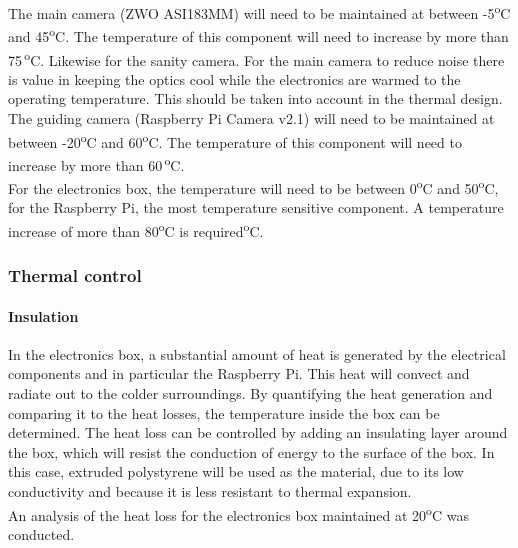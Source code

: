 The main camera (ZWO ASI183MM) will need to be maintained at between -5\textsuperscript{o}C and 45\textsuperscript{o}C. The temperature of this component will need to increase by more than 75\,\textsuperscript{o}C. Likewise for the sanity camera. For the main camera to reduce noise there is value in keeping the optics cool while the electronics are warmed to the operating temperature. This should be taken into account in the thermal design.\\

The guiding camera (Raspberry Pi Camera v2.1) will need to be maintained at between -20\textsuperscript{o}C and 60\textsuperscript{o}C. The temperature of this component will need to increase by more than 60\,\textsuperscript{o}C.\\

For the electronics box, the temperature will need to be between 0\textsuperscript{o}C and 50\textsuperscript{o}C, for the Raspberry Pi, the most temperature sensitive component. A temperature increase of more than 80\textsuperscript{o}C is required\textsuperscript{o}C.\\

\subsubsection{Thermal control}

\paragraph{Insulation}

In the electronics box, a substantial amount of heat is generated by the electrical components and in particular the Raspberry Pi. This heat will convect and radiate out to the colder surroundings. By quantifying the heat generation and comparing it to the heat losses, the temperature inside the box can be determined. The heat loss can be controlled by adding an insulating layer around the box, which will resist the conduction of energy to the surface of the box. In this case, extruded polystyrene will be used as the material, due to its low conductivity and because it is less resistant to thermal expansion. \\

An analysis of the heat loss for the electronics box maintained at 20\textsuperscript{o}C was conducted. \\

